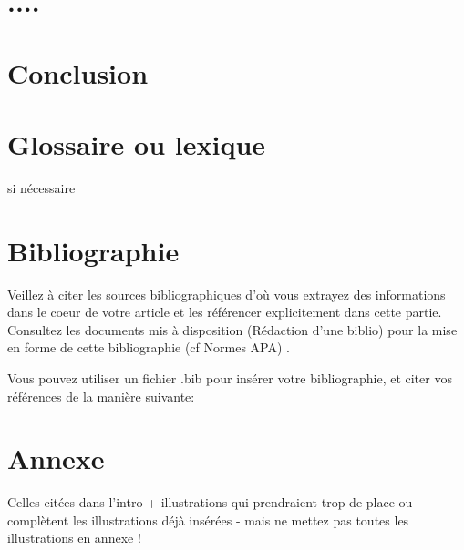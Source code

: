 \documentclass[a4paper,11pt]{article}
\begin{document}
\section {....}
\section {Conclusion} \section {Glossaire ou lexique } si nécessaire


\section {Bibliographie} Veillez à citer les sources bibliographiques d'où vous extrayez des informations dans le coeur de votre article et les référencer explicitement dans cette partie. 
\ \\
Consultez les documents mis à disposition (Rédaction d'une biblio) pour la mise en forme de cette bibliographie (cf Normes APA) \cite{x1} 
\cite{x2}.

Vous pouvez utiliser un fichier .bib pour insérer votre bibliographie, et citer vos références de la manière suivante: \cite{greenwade93}






\section {Annexe}  Celles citées dans l'intro +  illustrations qui prendraient trop de place ou complètent les illustrations déjà insérées  - mais ne mettez pas toutes les illustrations en annexe  ! 
\end{document}
